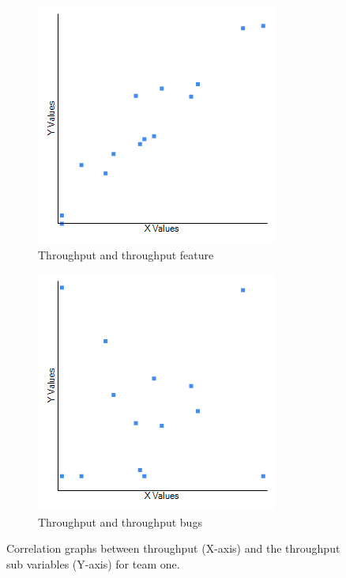 \documentclass[UKenglish]{ifimaster}  %
\begin{document}
\begin{figure}[h] 
  \begin{subfigure}[b]{0.5\textwidth}
  \center
\includegraphics[scale=0.6]{Picture/One/TPvsTPFT.png}
 \caption{Throughput and throughput feature} 
 \label{fig:a:1}
  \end{subfigure}
  \begin{subfigure}[b]{0.5\textwidth}
    \center
\includegraphics[scale=0.6]{Picture/One/TPvsTPB.png}
 \caption{Throughput and throughput bugs} 
\label{fig:b:1}
  \end{subfigure}
\caption{Correlation graphs between throughput (X-axis) and the throughput sub variables (Y-axis) for team one.}
\label{corr:Difference:1}
\end{figure}
\end{document}
